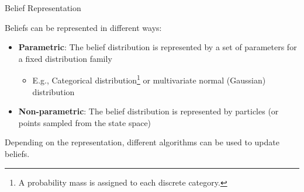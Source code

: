 \begin{frame}[fragile]{Belief Representation}

Beliefs can be represented in different ways:
\begin{itemize}
    \pause \item \textbf{Parametric}: The belief distribution is represented by a set of parameters for a fixed distribution family
    \begin{itemize}
        \item E.g., Categorical distribution\footnote{A probability mass is assigned to each discrete category.} or multivariate normal (Gaussian) distribution
    \end{itemize}
    \pause \item \textbf{Non-parametric}: The belief distribution is represented by particles (or points sampled from the state space)
\end{itemize}

\vspace{5mm}
\pause Depending on the representation, different algorithms can be used to update beliefs.


\end{frame}